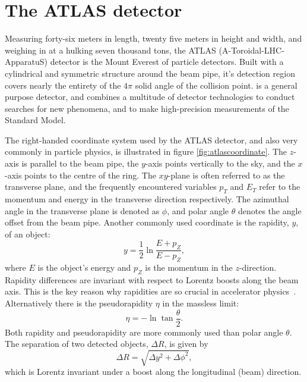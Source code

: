 \section{The ATLAS detector}\label{sec:ATLAS}

Measuring forty-six meters in length, twenty five meters in height and width, and weighing in at a hulking seven thousand tons, the ATLAS (A-Toroidal-LHC-ApparatuS) detector is the Mount Everest of particle detectors. Built with a cylindrical and symmetric structure around the beam pipe, it's detection region covers nearly the entirety of the $4\pi$ solid angle of the collision point. \ATLAS is a general purpose detector, and combines a multitude of detector technologies to conduct searches for new phenomena, and to make high-precision measurements of the Standard Model.

The right-handed coordinate system used by the ATLAS detector, and also very commonly in particle physics, is illustrated in figure \ref{fig:atlascoordinate}. The $z$-axis is parallel to the beam pipe, the $y$-axis points vertically to the sky, and the $x$-axis points to the centre of the \LHC ring. The $xy$-plane is often referred to as the transverse plane, and the frequently encountered variables $p_T$ and $E_T$ refer to the momentum and energy in the transverse direction respectively. The azimuthal angle in the transverse plane is denoted as $\phi$, and polar angle $\theta$ denotes the angle offset from the beam pipe. Another commonly used coordinate is the rapidity, $y$, of an object:
\begin{equation}
    y=\dfrac{1}{2}\ln\dfrac{E+p_Z}{E-p_Z},
\end{equation}
where $E$ is the object's energy and $p_Z$ is the momentum in the $z$-direction. Rapidity differences are invariant
with respect to Lorentz boosts along the beam axis. This is the key reason why rapidities are so crucial in accelerator physics~\cite{daw2012}. Alternatively there is the pseudorapidity $\eta$ in the massless limit:
\begin{equation}
    \eta=-\ln\tan \dfrac{\theta}{2}.
\end{equation}
Both rapidity and pseudorapidity are more commonly used than polar angle $\theta$. The separation of two detected objects, $\Delta R$, is given by
\begin{equation}
    \Delta R=\sqrt{\Delta y^2+\Delta\phi^2},
\end{equation}
which is Lorentz invariant under a boost along the longitudinal (beam) direction.

